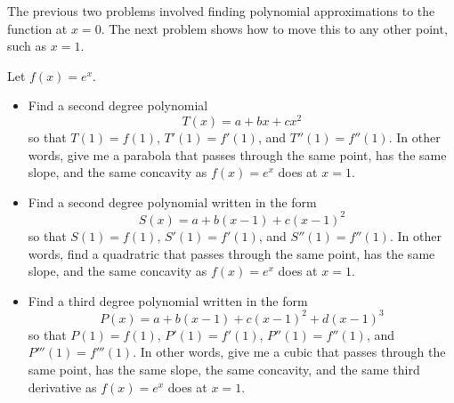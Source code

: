 The previous two problems involved finding polynomial approximations to the function at $x=0$. The next problem shows how to move this to any other point, such as $x=1$. 
\begin{problem} \label{Taylor at 1}
Let $f(x)=e^x$.
\begin{itemize}
\item Find a second degree polynomial $$T(x)=a+bx+cx^2$$ so that $T(1)=f(1)$, $T'(1)=f'(1)$, and $T''(1)=f''(1)$. In other words, give me a parabola that passes through the same point, has the same slope, and the same concavity as $f(x)=e^x$ does at $x=1$. 
\item Find a second degree polynomial written in the form $$S(x)=a+b(x-1)+c(x-1)^2$$  so that $S(1)=f(1)$, $S'(1)=f'(1)$, and $S''(1)=f''(1)$. In other words, find a quadratric that passes through the same point, has the same slope, and the same concavity as $f(x)=e^x$ does at $x=1$. 
\item Find a third degree polynomial written in the form $$P(x)=a+b(x-1)+c(x-1)^2+d(x-1)^3$$ so that $P(1)=f(1)$, $P'(1)=f'(1)$, $P''(1)=f''(1)$, and $P'''(1)=f'''(1)$. In other words, give me a cubic that passes through the same point, has the same slope, the same concavity, and the same third derivative as $f(x)=e^x$ does at $x=1$. 
\end{itemize}
\end{problem} 


 

